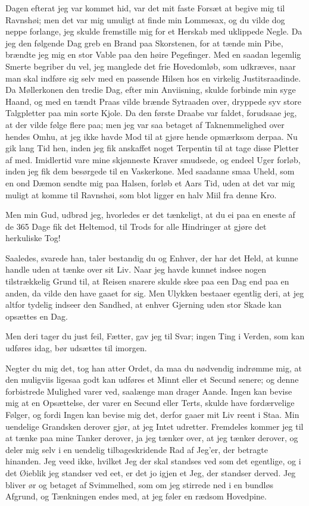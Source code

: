 \documentclass[12pt]{article}
\newcommand{\apage}[1]{\marginnote{\footnotesize\textit{[#1]}}}
\begin{document}
Dagen efterat jeg var kommet hid, var det mit faste Forsæt at
begive mig til Ravnshøi; men det var mig umuligt at finde min
Lommesax, og du vilde dog neppe forlange, jeg skulde fremstille mig
for et Herskab med uklippede Negle. Da jeg den følgende Dag greb en
Brand paa Skorstenen, for at tænde min Pibe, brændte jeg mig en stor
Vable paa den høire Pegefinger. Med en saadan legemlig Smerte begriber
du vel, jeg manglede det frie Hovedomløb, som udkræves, naar man skal
indføre sig selv med en passende Hilsen hos en virkelig Justitsraadinde.
Da Møllerkonen den tredie Dag, efter min Anviisning, skulde forbinde
min syge Haand, og med en tændt Praas vilde brænde Sytraaden over,
dryppede syv store Talgpletter paa min sorte Kjole. Da den første
Draabe var faldet, forudsaae jeg, at der vilde følge flere paa; men
jeg var saa betaget af Taknemmelighed over hendes Omhu, at jeg ikke
havde Mod til at gjøre hende opmærksom derpaa. Nu gik lang Tid hen,
inden jeg fik anskaffet noget Terpentin til at tage disse Pletter af
med. Imidlertid vare mine skjønneste Kraver smudsede, og endeel Uger
forløb, inden jeg fik dem besørgede til en Vaskerkone. Med saadanne
smaa Uheld, som en ond Dæmon sendte mig paa Halsen, forløb et Aars
Tid, uden at det var mig muligt at komme til Ravnshøi, som blot ligger
en halv Miil fra denne Kro.

Men min Gud, udbrød jeg, hvorledes er det tænkeligt, at du ei paa
en eneste af de 365 Dage fik det Heltemod, til Trods for alle
Hindringer at gjøre det herkuliske Tog!

Saaledes, svarede han, taler bestandig du og Enhver, der \apage{92} har det
Held, at kunne handle uden at tænke over sit Liv. Naar jeg havde
kunnet indsee nogen tilstrækkelig Grund til, at Reisen snarere skulde
skee paa een Dag end paa en anden, da vilde den have gaaet for sig.
Men Ulykken bestaaer egentlig deri, at jeg altfor tydelig indseer den
Sandhed, at enhver Gjerning uden stor Skade kan opsættes en Dag.

Men deri tager du just feil, Fætter, gav jeg til Svar; ingen Ting
i Verden, som kan udføres idag, bør udsættes til imorgen.

Negter du mig det, tog han atter Ordet, da maa du nødvendig
indrømme mig, at den muligviis ligesaa godt kan udføres et Minnt
eller et Secund senere; og denne forbistrede Mulighed varer ved,
saalænge man drager Aande. Ingen kan bevise mig at en Opsættelse, der
varer en Secund eller Terts, skulde have fordærvelige Følger, og fordi
Ingen kan bevise mig det, derfor gaaer mit Liv reent i Staa. Min
uendelige Grandsken derover gjør, at jeg Intet udretter. Fremdeles
kommer jeg til at tænke paa mine Tanker derover, ja jeg tænker over,
at jeg tænker derover, og deler mig selv i en uendelig tilbageskridende
Rad af Jeg'er, der betragte hinanden. Jeg veed ikke, hvilket Jeg der
skal standses ved som det egentlige, og i det Øieblik jeg standser ved
eet, er det jo igjen et Jeg, der standser derved. Jeg bliver ør og
betaget af Svimmelhed, som om jeg stirrede ned i en bundløs Afgrund,
og Tænkningen endes med, at jeg føler en rædsom Hovedpine.
\end{document}
